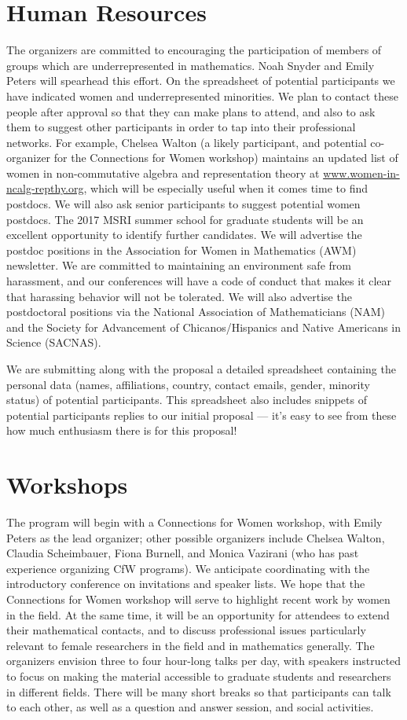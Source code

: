 \documentclass[12pt]{article}
\begin{document}
\section{Human Resources}
The organizers are committed to encouraging the participation of members of groups which are underrepresented in mathematics. Noah Snyder and Emily Peters will spearhead this effort. On the spreadsheet of potential participants we have indicated women and underrepresented minorities. We plan to contact these people after approval so that they can make plans to attend, and also to ask them to suggest other participants in order to tap into their professional networks. For example, Chelsea Walton (a likely participant, and potential co-organizer for the Connections for Women workshop) maintains an updated list of women in non-commutative algebra and representation theory at \url{www.women-in-ncalg-repthy.org}, which will be especially useful when it comes time to find postdocs. We will also ask senior participants to suggest potential women postdocs. The 2017 MSRI summer school for graduate students will be an excellent opportunity to identify further candidates. We will advertise the postdoc positions in the Association for Women in Mathematics (AWM) newsletter.  We are committed to maintaining an environment safe from harassment, and our conferences will have a code of conduct that makes it clear that harassing behavior will not be tolerated.  We will also advertise the postdoctoral positions via the National Association of Mathematicians (NAM) and the Society for Advancement of Chicanos/Hispanics and Native Americans in Science (SACNAS).

We are submitting along with the proposal a detailed spreadsheet containing the personal data (names, affiliations, country, contact emails, gender, minority status) of potential participants. This spreadsheet also includes snippets of potential participants replies to our initial proposal --- it's easy to see from these how much enthusiasm there is for this proposal!


\section{Workshops}
The program will begin with a Connections for Women workshop, with Emily Peters as the lead organizer; other possible organizers include Chelsea Walton, Claudia Scheimbauer, Fiona Burnell, and Monica Vazirani (who has past experience organizing CfW programs). We anticipate coordinating with the introductory conference on invitations and speaker lists.  We hope that the Connections for Women workshop will serve to highlight recent work by women in the field. At the same time, it will be an opportunity for attendees to extend their mathematical contacts, and to discuss professional issues particularly relevant to female researchers in the field and in mathematics generally.  The organizers envision three to four hour-long talks per day, with speakers instructed to focus on making the material accessible to graduate students and researchers in different fields.  There will be many short breaks so that participants can talk to each other, as well as a question and answer session, and social activities.
\end{document}
